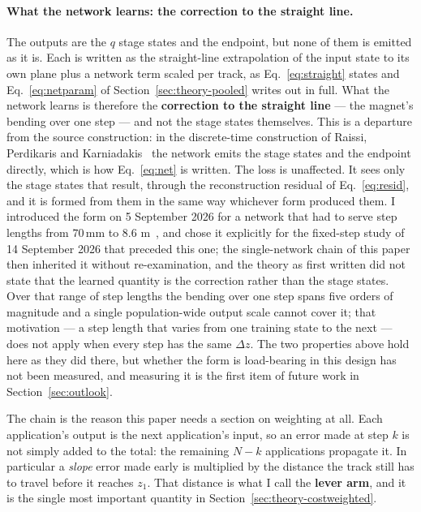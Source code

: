 \documentclass[11pt,a4paper]{article}
\newcommand{\mm}{\ensuremath{\,\mathrm{mm}}}
\begin{document}
\paragraph{What the network learns: the correction to the straight line.} The
outputs are the $q$ stage states and the endpoint, but none of them is emitted
as it is. Each is written as the straight-line extrapolation of the input state
to its own plane plus a network term scaled per track, as
Eq.~\eqref{eq:straight} states and Eq.~\eqref{eq:netparam} of
Section~\ref{sec:theory-pooled} writes out in full. What the network learns is
therefore the \textbf{correction to the straight line} --- the magnet's bending
over one step --- and not the stage states themselves. This is a departure from
the source construction: in the discrete-time construction of Raissi, Perdikaris
and Karniadakis~\citep[\S3]{raissi2019} the network emits the stage states and
the endpoint directly, which is how Eq.~\eqref{eq:net} is written. The loss is
unaffected. It sees only the stage states that result, through the
reconstruction residual of Eq.~\eqref{eq:resid}, and it is formed from them in
the same way whichever form produced them. I introduced the form on
5 September 2026 for a network that had to serve step lengths from $70\mm$ to
$8.6$ m~\citep[\S3.10]{scriven2026lhcb1}, and chose it explicitly for the
fixed-step study of 14 September 2026 that preceded this one; the single-network
chain of this paper then inherited it without re-examination, and the theory as
first written did not state that the learned quantity is the correction rather
than the stage states. Over that range of step lengths the bending over one step
spans five orders of magnitude and a single population-wide output scale cannot
cover it; that motivation --- a step length that varies from one training state
to the next --- does not apply when every step has the same $\Delta z$. The two properties above hold here as they did there, but whether
the form is load-bearing in this design has not been measured, and measuring it
is the first item of future work in Section~\ref{sec:outlook}.

The chain is the reason this paper needs a section on weighting at all. Each
application's output is the next application's input, so an error made at step
$k$ is not simply added to the total: the remaining $N - k$ applications
propagate it. In particular a \emph{slope} error made early is multiplied by
the distance the track still has to travel before it reaches $z_1$. That
distance is what I call the \textbf{lever arm}, and it is the single most
important quantity in Section~\ref{sec:theory-costweighted}.
\end{document}
